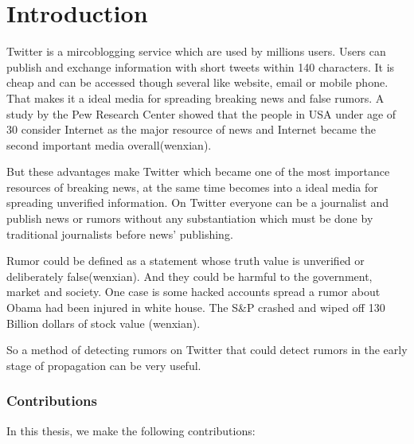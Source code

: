 \chapter{Introduction} %
\label{cha:introduction}
Twitter is a mircoblogging service which are used by millions users. Users can publish and exchange information with short tweets within 140 characters. It is cheap and can be accessed though several like website, email or mobile phone. That makes it a ideal media for spreading breaking news and false rumors.  A study by the Pew Research Center showed that the people in USA under age of 30 consider Internet as the major resource of news and Internet became the second important media overall(wenxian).

But these advantages make Twitter which became one of the most importance resources of breaking news, at the same time becomes into a ideal media for spreading unverified information. On Twitter everyone can be a journalist and publish news or rumors without any substantiation which must be done by traditional journalists before news' publishing. 

 Rumor could be defined as a statement whose truth value is unverified or deliberately false(wenxian). And they could be harmful to the government, market and society. One case is some hacked accounts spread a rumor about Obama had been injured in white house. The S\&P crashed and wiped off 130 Billion dollars of stock value (wenxian). 
 
 So a method of detecting rumors on Twitter that could detect rumors in the early stage of propagation can be very useful.    

 
 \subsection{Contributions}
In this thesis, we make the following contributions:


